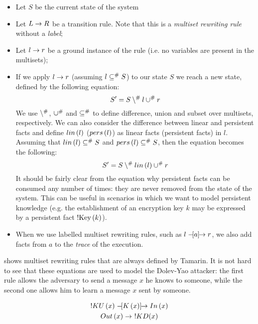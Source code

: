 \begin{itemize}
    \item{Let $S$ be the current state of the system}
    \item{Let $L \rightarrow R$ be a transition rule. Note that this is a \textit{multiset rewriting rule} without a \textit{label};}
    \item{Let $l \rightarrow r$ be a ground instance of the rule (i.e. no variables are present in the multisets);}
    \item{If we apply $l \rightarrow r$ (assuming $l \subseteq^\# S$) to our state $S$ we reach a new state, defined by the following equation:
                \begin{equation}
                    S' = S \setminus^\# l \cup^\# r
                \end{equation}
                We use $\setminus^\#$, $\cup^\#$ and $\subseteq^\#$ to define difference, union and subset over multisets, respectively. We can also consider the difference between linear and persistent facts and define $lin\left(l\right)$ ($pers\left(l\right)$) as linear facts (persistent facts) in $l$. Assuming that $lin\left(l\right) \subseteq^\# S$ and $pers\left(l\right) \subseteq^\# S$, then the equation becomes the following:
                \begin{equation}
                    S' = S \setminus^\# lin\left(l\right) \cup^\# r
                \end{equation}
                It should be fairly clear from the equation why persistent facts can be consumed any number of times: they are never removed from the state of the system. This can be useful in scenarios in which we want to model persistent knowledge (e.g. the establishment of an encryption key $k$ may be expressed by a persistent fact $\mbox{!Key}\left(k\right)$).
          }
    \item{When we use labelled multiset rewriting rules, such as $l \mathrel{-\hspace{-2pt}[a]\hspace{-4pt}\to} r$, we also add facts from $a$ to the \textit{trace} of the execution.}
\end{itemize}

 shows multiset rewriting rules that are always defined by Tamarin. It is not hard to see that these equations are used to model the Dolev-Yao attacker: the first rule allows the adversary to send a message $x$ he knows to someone, while the second one allows him to learn a message $x$ sent by someone.

\begin{equation}
    \label{eq:built-in-tamarin-msr-rules}
    \begin{gathered}
        !KU\left(x\right) \mathrel{-\hspace{-2pt}[K\left(x\right)]\hspace{-4pt}\to} In\left(x\right)\\
        Out\left(x\right) \rightarrow \ !KD(x)
    \end{gathered}
\end{equation}


